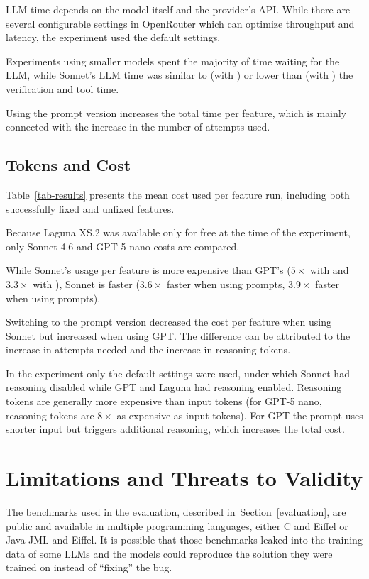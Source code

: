 \documentclass[runningheads]{llncs}
\newcommand{\secref}[1]{Section~\ref{#1}}
\newcommand{\tabref}[1]{Table~\ref{#1}}
\begin{document}
LLM time depends on the model itself and the provider's API. While there
are several configurable settings in OpenRouter which can optimize throughput
and latency, the experiment used the default settings.

Experiments using smaller models spent the majority of time waiting for the LLM,
while Sonnet's LLM time was similar to (with \rich{}) or lower than (with \bare{})
the verification and tool time.

Using the \bare{} prompt version increases the total time per feature, which
is mainly connected with the increase in the number of attempts used.

\subsection{Tokens and Cost}
\tabref{tab-results} presents the mean cost used per feature run,
including both successfully fixed and unfixed features.

Because Laguna XS.2 was available only for free at the time of the experiment,
only Sonnet 4.6 and GPT-5 nano costs are compared.

While Sonnet's usage per feature is more expensive than GPT's
($5\times$ with \rich{} and $3.3\times$ with \bare{}),
Sonnet is faster ($3.6\times$ faster when using \rich{} prompts,
$3.9\times$ faster when using \bare{} prompts).

Switching to the \bare{} prompt version decreased the cost per feature when
using Sonnet but increased when using GPT. The difference can be attributed
to the increase in attempts needed and
the increase in reasoning tokens.

In the experiment only the default settings were used, under which Sonnet had reasoning disabled
while GPT and Laguna
had reasoning enabled. Reasoning tokens are generally more expensive than input tokens
(for GPT-5 nano, reasoning tokens are $8\times$ as expensive as input tokens).
For GPT the \bare{} prompt uses shorter input but triggers additional reasoning,
which increases the total cost.

\section{Limitations and Threats to Validity}\label{limitations}
The benchmarks used in the evaluation, described in~\secref{evaluation},
are public and available in multiple programming languages, either C and Eiffel or Java-JML and Eiffel.
It is possible that those benchmarks leaked into the training data of some LLMs and
the models could reproduce the solution they were trained on instead of ``fixing''
the bug.
\end{document}
